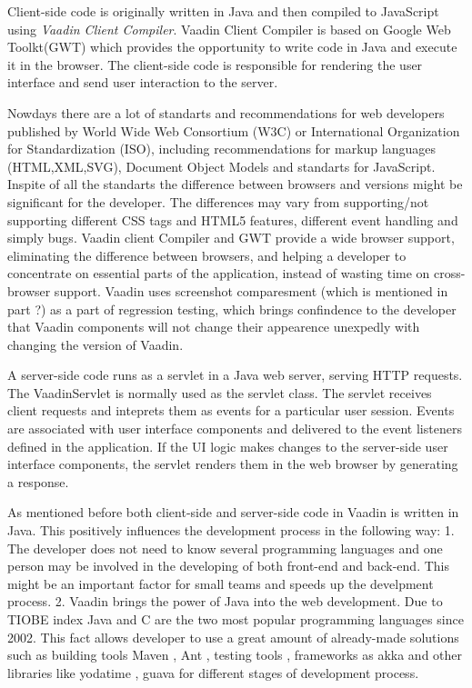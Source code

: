 \documentclass{article}
\begin{document}
	 Client-side code is originally written in Java and then
	 compiled to JavaScript using \emph{Vaadin Client Compiler}. Vaadin Client Compiler is based on Google
	 Web Toolkt(GWT) which provides the opportunity to write code in Java and
	 execute it in the browser. The client-side code is responsible for rendering
	 the user interface and send user interaction to the server.
	
	 Nowdays there are a lot of standarts and recommendations for web
	 developers published by World Wide Web Consortium (W3C) or  International
	 Organization for Standardization (ISO), including recommendations for
	 markup languages (HTML,XML,SVG), Document Object Models and standarts
	 for JavaScript. Inspite of all the standarts the difference between browsers
	 and versions might be significant for the developer. The differences may vary
	 from supporting/not supporting different CSS tags and HTML5 features,
	 different event handling and simply bugs. Vaadin client Compiler and GWT provide a wide browser
	 support, eliminating the difference between browsers, and helping a
	 developer to concentrate on essential parts of the application, instead of
	 wasting time on cross-browser support. Vaadin uses screenshot comparesment
	 (which is mentioned in part ?) as a part of regression testing, which brings
	 confindence to the developer that Vaadin components will not change their
	 appearence unexpedly with changing the version of Vaadin. 
	 
	 A server-side code runs as a servlet in a Java web server, serving HTTP
	 requests.
	 The VaadinServlet is normally used as the servlet class. The servlet receives client requests
	 and inteprets them as events for a particular user session.
	 Events are associated with user interface components and delivered to the event listeners defined in the application.
	 If the UI logic makes changes to the server-side user interface components, 
	 the servlet renders them in the web browser by generating a response.
	 
	 
	 As mentioned before both client-side and server-side code in Vaadin is written
	 in Java. This positively influences the development process in the following
	 way:
	  1. The developer does not need to know several programming languages and one
	  person may be involved in the developing of both front-end and back-end. This
	  might be an important factor for small teams and speeds up the develpment
	  process.
	  2. Vaadin brings the power of Java into the web development. Due to
	  TIOBE index \cite{tiobeIndex} Java and C are the two most popular programming
	  languages since 2002. This fact allows developer to use a great amount of
	  already-made solutions such as building tools Maven \cite{maven}, Ant
	  \cite{ant}, testing tools \cite{junit}, frameworks as akka \cite{akka} and
	  other libraries like yodatime \cite{yodatime}, guava \cite{guava} for different stages of development
	  process.
	  
\end{document}
